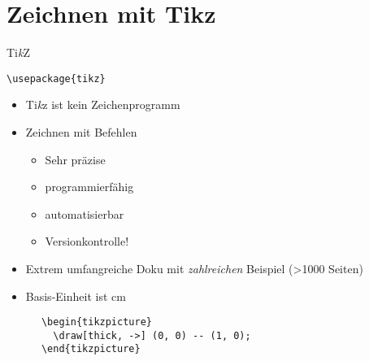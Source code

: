 \section{Zeichnen mit Tikz}

\begin{frame}[fragile]{%
  Ti\textit{k}Z
  \hfill
}
  \begin{Packages}
    \lstinline+\usepackage{tikz}+
  \end{Packages}
  \begin{itemize}
    \item \alert{T}i\textit{k}z \alert{i}st \alert{k}ein \alert{Z}eichenprogramm
    \item Zeichnen mit Befehlen
      \begin{itemize}
        \item Sehr präzise
        \item programmierfähig
        \item automatisierbar
        \item Versionkontrolle!
      \end{itemize}
    \item Extrem umfangreiche Doku mit \emph{zahlreichen} Beispiel (>\num{1000} Seiten)
    \item Basis-Einheit ist \si{\centi\meter}
  \end{itemize}
  \begin{CodeExample}{0.7}
    \begin{lstlisting}
      \begin{tikzpicture}
        \draw[thick, ->] (0, 0) -- (1, 0);
      \end{tikzpicture}
    \end{lstlisting}
  \CodeResult
  \strut\\
  \end{CodeExample}
\end{frame}
